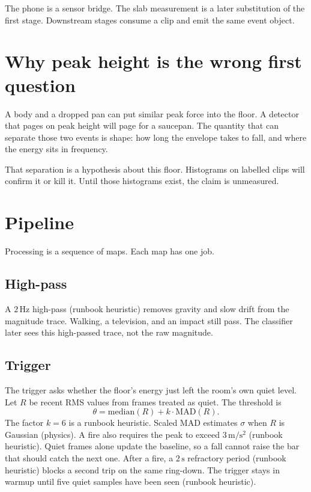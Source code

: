 \documentclass[11pt,a4paper]{article}
\newcommand{\src}[1]{\textnormal{\small (#1)}}
\begin{document}
The phone is a sensor bridge. The slab measurement is a later substitution of the first stage. Downstream stages consume a clip and emit the same event object.

\section{Why peak height is the wrong first question}

A body and a dropped pan can put similar peak force into the floor. A detector that pages on peak height will page for a saucepan. The quantity that can separate those two events is shape: how long the envelope takes to fall, and where the energy sits in frequency.

That separation is a hypothesis about this floor. Histograms on labelled clips will confirm it or kill it. Until those histograms exist, the claim is unmeasured.

\section{Pipeline}

Processing is a sequence of maps. Each map has one job.

\subsection{High-pass}

A \(2\,\mathrm{Hz}\) high-pass \src{runbook heuristic} removes gravity and slow drift from the magnitude trace. Walking, a television, and an impact still pass. The classifier later sees this high-passed trace, not the raw magnitude.

\subsection{Trigger}

The trigger asks whether the floor's energy just left the room's own quiet level. Let \(R\) be recent RMS values from frames treated as quiet. The threshold is
\[
\theta = \mathrm{median}(R) + k\cdot\mathrm{MAD}(R).
\]
The factor \(k=6\) is a runbook heuristic. Scaled MAD estimates \(\sigma\) when \(R\) is Gaussian \src{physics}. A fire also requires the peak to exceed \(3\,\mathrm{m/s^2}\) \src{runbook heuristic}. Quiet frames alone update the baseline, so a fall cannot raise the bar that should catch the next one. After a fire, a \(2\,\mathrm{s}\) refractory period \src{runbook heuristic} blocks a second trip on the same ring-down. The trigger stays in warmup until five quiet samples have been seen \src{runbook heuristic}.
\end{document}
